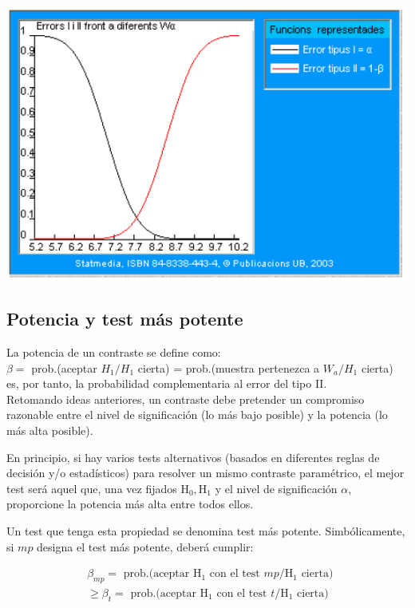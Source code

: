\documentclass[
]{article}
\begin{document}
\begin{center}\includegraphics[width=0.9\linewidth]{images/cap9-PlotProbsErrTipo_1_y_2b} \end{center}

\subsection{Potencia y test más potente}\label{potencia-y-test-muxe1s-potente}

La potencia de un contraste se define como:\\
\(\beta=\) prob.(aceptar \(H_{1}/H_{1}\) cierta) = prob.(muestra pertenezca a \(W_{a}/H_{1}\) cierta)\\
es, por tanto, la probabilidad complementaria al error del tipo II.\\
Retomando ideas anteriores, un contraste debe pretender un compromiso razonable entre el nivel de significación (lo más bajo posible) y la potencia (lo más alta posible).

En principio, si hay varios tests alternativos (basados en diferentes reglas de decisión y/o estadísticos) para resolver un mismo contraste paramétrico, el mejor test será aquel que, una vez fijados \(\mathrm{H}_{0}, \mathrm{H}_{1}\) y el nivel de significación \(\alpha\), proporcione la potencia más alta entre todos ellos.

Un test que tenga esta propiedad se denomina test más potente. Simbólicamente, si \(mp\) designa el test más potente, deberá cumplir:

\[
\begin{aligned}
& \beta_{m p}=\text { prob.(aceptar } \mathrm{H}_{1} \text { con el test } m p / \mathrm{H}_{1} \text { cierta) } \\
& \geq \beta_{t}=\text { prob.(aceptar } \mathrm{H}_{1} \text { con el test } t / \mathrm{H}_{1} \text { cierta) }
\end{aligned}
\]
\end{document}

